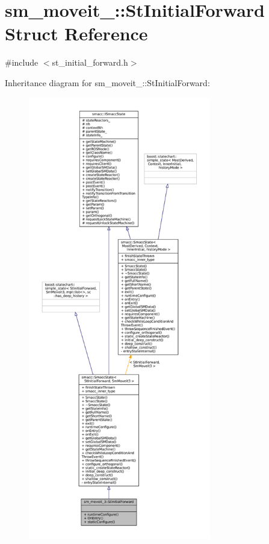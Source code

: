 \hypertarget{structsm__moveit__3_1_1StInitialForward}{}\section{sm\+\_\+moveit\+\_\+:\+:St\+Initial\+Forward Struct Reference}
\label{structsm__moveit__3_1_1StInitialForward}


{\ttfamily \#include $<$st\+\_\+initial\+\_\+forward.\+h$>$}



Inheritance diagram for sm\+\_\+moveit\+\_\+:\+:St\+Initial\+Forward\+:
\nopagebreak
\begin{figure}[H]
\begin{center}
\leavevmode
\includegraphics[height=550pt]{structsm__moveit__3_1_1StInitialForward__inherit__graph}
\end{center}
\end{figure}


